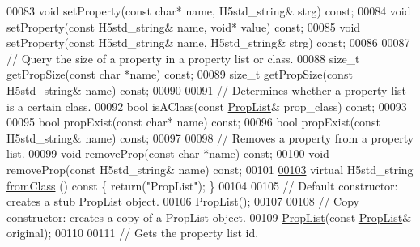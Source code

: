 \begin{DoxyCode}
00083         \textcolor{keywordtype}{void} setProperty(\textcolor{keyword}{const} \textcolor{keywordtype}{char}* name, H5std\_string& strg) \textcolor{keyword}{const};
00084         \textcolor{keywordtype}{void} setProperty(\textcolor{keyword}{const} H5std\_string& name, \textcolor{keywordtype}{void}* value) \textcolor{keyword}{const};
00085         \textcolor{keywordtype}{void} setProperty(\textcolor{keyword}{const} H5std\_string& name, H5std\_string& strg) \textcolor{keyword}{const};
00086 
00087         \textcolor{comment}{// Query the size of a property in a property list or class.}
00088         \textcolor{keywordtype}{size\_t} getPropSize(\textcolor{keyword}{const} \textcolor{keywordtype}{char} *name) \textcolor{keyword}{const};
00089         \textcolor{keywordtype}{size\_t} getPropSize(\textcolor{keyword}{const} H5std\_string& name) \textcolor{keyword}{const};
00090 
00091         \textcolor{comment}{// Determines whether a property list is a certain class.}
00092         \textcolor{keywordtype}{bool} isAClass(\textcolor{keyword}{const} \hyperlink{class_h5_1_1_prop_list}{PropList}& prop\_class) \textcolor{keyword}{const};
00093 
00095         \textcolor{keywordtype}{bool} propExist(\textcolor{keyword}{const} \textcolor{keywordtype}{char}* name) \textcolor{keyword}{const};
00096         \textcolor{keywordtype}{bool} propExist(\textcolor{keyword}{const} H5std\_string& name) \textcolor{keyword}{const};
00097 
00098         \textcolor{comment}{// Removes a property from a property list.}
00099         \textcolor{keywordtype}{void} removeProp(\textcolor{keyword}{const} \textcolor{keywordtype}{char} *name) \textcolor{keyword}{const};
00100         \textcolor{keywordtype}{void} removeProp(\textcolor{keyword}{const} H5std\_string& name) \textcolor{keyword}{const};
00101 
\hyperlink{class_h5_1_1_prop_list_a090ada6d21725f711f017b5457383077}{00103}         \textcolor{keyword}{virtual} H5std\_string \hyperlink{class_h5_1_1_prop_list_a090ada6d21725f711f017b5457383077}{fromClass} ()\textcolor{keyword}{ const }\{ \textcolor{keywordflow}{return}(\textcolor{stringliteral}{"PropList"}); \}
00104 
00105         \textcolor{comment}{// Default constructor: creates a stub PropList object.}
00106         \hyperlink{class_h5_1_1_prop_list}{PropList}();
00107 
00108         \textcolor{comment}{// Copy constructor: creates a copy of a PropList object.}
00109         \hyperlink{class_h5_1_1_prop_list}{PropList}(\textcolor{keyword}{const} \hyperlink{class_h5_1_1_prop_list}{PropList}& original);
00110 
00111         \textcolor{comment}{// Gets the property list id.}

\end{DoxyCode}
